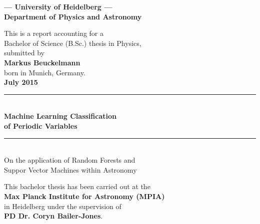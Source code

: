 \begin{titlepage}
\begin{center}

\Large\textbf{--- University of Heidelberg ---\\Department of Physics and Astronomy}

\vspace{12cm}

\normalsize
This is a report accounting for a\\
Bachelor of Science (B.Sc.) thesis in Physics,\\
submitted by\\
\vspace{0.2cm}
\Large\textbf{Markus Beuckelmann}\\
\normalsize
\vspace{0.2cm}
born in Munich, Germany.\\
\vspace{0.5cm}
\Large\textbf{July 2015}
\normalsize

\newpage

\vspace*{6cm}

\rule{0.90\linewidth}{0.6pt}\\
\Huge\textbf{Machine Learning Classification\\ of Periodic Variables}
\rule{0.90\linewidth}{0.6pt}\\
\vspace{1cm}
\large{On the application of Random Forests and\\Suppor Vector Machines within Astronomy}

\vfill

\normalsize
This bachelor thesis has been carried out at the\\
\textbf{Max Planck Institute for Astronomy (MPIA)}\\ in Heidelberg
under the supervision of\\
\textbf{PD Dr. Coryn Bailer-Jones}.


\end{center}

\end{titlepage}
